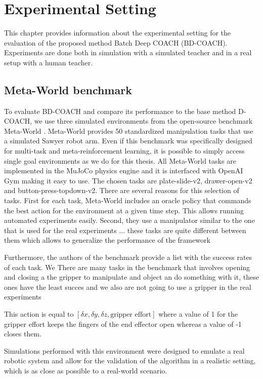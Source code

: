 \chapter{Experimental Setting}
\label{chapter:Experimental Setting}

This chapter provides information about the experimental setting for the evaluation of the proposed method Batch Deep COACH (BD-COACH). Experiments are done both in simulation with a simulated teacher and in a real setup with a human teacher.


\section{Meta-World benchmark}
\label{section:Meta-World Benchmark}
To evaluate BD-COACH and compare its performance to the base method D-COACH, we use three simulated environments from the open-source benchmark Meta-World \cite{metaworld}. Meta-World 
provides 50 standardized manipulation tasks that use a simulated Sawyer robot arm. Even if this benchmark was specifically designed for multi-task and meta-reinforcement learning, it is possible to simply access single goal environments as we do for this thesis. All Meta-World tasks are implemented in the MuJoCo physics engine \cite{mujoco} and it is interfaced with OpenAI Gym \cite{openai} making it easy to use. The chosen tasks are plate-slide-v2, drawer-open-v2 and button-press-topdown-v2. There are several reasons for this selection of tasks. First for each task, Meta-World includes an oracle policy that commands the best action for the environment at a given time step. This allows running automated experiments easily. Second, they use a manipulator similar to the one that is used for the  real experiments ... these tasks are quite different between them which allows to generalize the performance of the framework 

Furthermore, the authors of the benchmark \cite{metaworld} provide a list with the success rates of each task. We There are many tasks in the benchmark that involves opening and closing a the gripper to manipulate and object an do something with it, these ones have the least succes and we also are not going to use a gripper in the real experiments

This action is equal to 
$[\delta x, \delta y, \delta z, \textrm{gripper effort}]$
where a value of 1 for the gripper effort keeps the fingers of the end effector open whereas a value of -1 closes them.


Simulations performed
with this environment were designed to emulate a real robotic system and allow for the validation of
the algorithm in a realistic setting, which is as close as possible to a real-world scenario.




